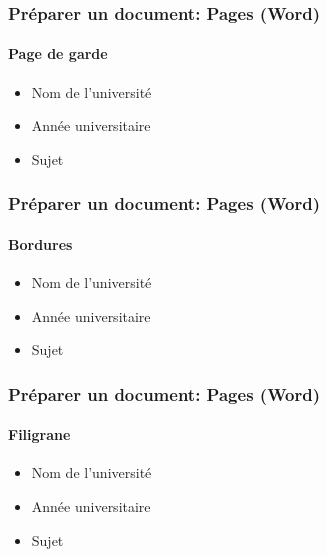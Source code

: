 \documentclass[xcolor=table]{beamer}
\begin{document}
\begin{frame}[t]
\frametitle{Préparer un document: Pages (Word)}
\framesubtitle{Page de garde}

\begin{minipage}{0.38\textwidth}
	\begin{itemize}
		\item Nom de l'université 
		\item Année universitaire
		\item Sujet
	\end{itemize}
\end{minipage}
\begin{minipage}{0.6\textwidth}
\end{minipage}

\end{frame}

\begin{frame}[t]
\frametitle{Préparer un document: Pages (Word)}
\framesubtitle{Bordures}

\begin{minipage}{0.43\textwidth}
	\begin{itemize}
		\item Nom de l'université 
		\item Année universitaire
		\item Sujet
	\end{itemize}
\end{minipage}
\begin{minipage}{0.55\textwidth}
\end{minipage}

\end{frame}

\begin{frame}[t]
\frametitle{Préparer un document: Pages (Word)}
\framesubtitle{Filigrane}

\begin{minipage}{0.43\textwidth}
	\begin{itemize}
		\item Nom de l'université 
		\item Année universitaire
		\item Sujet
	\end{itemize}
\end{minipage}
\begin{minipage}{0.55\textwidth}
\end{minipage}

\end{frame}
\end{document}
